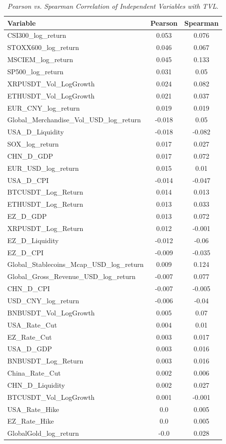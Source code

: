 \begin{table}[h]
  \centering
  \caption{\textit{Pearson vs. Spearman Correlation of Independent Variables with TVL}.}
  \label{tab:pear_spear_cor_tvl_2018_2025}
  \begin{tabular}{lcc}
    \toprule
    \textbf{Variable} & \textbf{Pearson} & \textbf{Spearman} \\ 
    \midrule
    CSI300\_log\_return & 0.053 & 0.076 \\ 
    STOXX600\_log\_return & 0.046 & 0.067 \\ 
    MSCIEM\_log\_return & 0.045 & 0.133 \\ 
    SP500\_log\_return & 0.031 & 0.05 \\ 
    XRPUSDT\_Vol\_LogGrowth & 0.024 & 0.082 \\ 
    ETHUSDT\_Vol\_LogGrowth & 0.021 & 0.037 \\ 
    EUR\_CNY\_log\_return & 0.019 & 0.019 \\ 
    Global\_Merchandise\_Vol\_USD\_log\_return & -0.018 & 0.05 \\ 
    USA\_D\_Liquidity & -0.018 & -0.082 \\ 
    SOX\_log\_return & 0.017 & 0.027 \\ 
    CHN\_D\_GDP & 0.017 & 0.072 \\ 
    EUR\_USD\_log\_return & 0.015 & 0.01 \\ 
    USA\_D\_CPI & -0.014 & -0.047 \\ 
    BTCUSDT\_Log\_Return & 0.014 & 0.013 \\ 
    ETHUSDT\_Log\_Return & 0.013 & 0.033 \\ 
    EZ\_D\_GDP & 0.013 & 0.072 \\ 
    XRPUSDT\_Log\_Return & 0.012 & -0.001 \\ 
    EZ\_D\_Liquidity & -0.012 & -0.06 \\ 
    EZ\_D\_CPI & -0.009 & -0.035 \\ 
    Global\_Stablecoins\_Mcap\_USD\_log\_return & 0.009 & 0.124 \\ 
    Global\_Gross\_Revenue\_USD\_log\_return & -0.007 & 0.077 \\ 
    CHN\_D\_CPI & -0.007 & -0.005 \\ 
    USD\_CNY\_log\_return & -0.006 & -0.04 \\ 
    BNBUSDT\_Vol\_LogGrowth & 0.005 & 0.07 \\ 
    USA\_Rate\_Cut & 0.004 & 0.01 \\ 
    EZ\_Rate\_Cut & 0.003 & 0.017 \\ 
    USA\_D\_GDP & 0.003 & 0.016 \\ 
    BNBUSDT\_Log\_Return & 0.003 & 0.016 \\ 
    China\_Rate\_Cut & 0.002 & 0.006 \\ 
    CHN\_D\_Liquidity & 0.002 & 0.027 \\ 
    BTCUSDT\_Vol\_LogGrowth & 0.001 & -0.001 \\ 
    USA\_Rate\_Hike & 0.0 & 0.005 \\ 
    EZ\_Rate\_Hike & 0.0 & 0.005 \\ 
    GlobalGold\_log\_return & -0.0 & 0.028 \\ 
    \bottomrule
  \end{tabular}
\end{table}